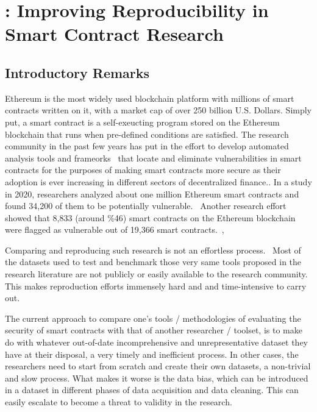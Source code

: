\chapter{\etherbase: Improving Reproducibility in Smart Contract Research} \label{ch:etherbase}


\section{Introductory Remarks}
	\label{sec:intro}
	Ethereum is the most widely used blockchain platform with millions of smart contracts written on it, with a market cap of over 250 billion U.S. Dollars.
	Simply put, a smart contract is a self-exeucting program stored on the Ethereum blockchain that runs when pre-defined conditions are satisfied.
	The research community in the past few years has put in the effort to develop automated analysis tools and frameorks~\cite{ref_tools} that locate and eliminate vulnerabilities in smart contracts for the purposes of making smart contracts more secure as their adoption is ever increasing in different sectors of decentralized finance..
	In a study in 2020, researchers analyzed about one million Ethereum smart contracts and found 34,200 of them to be potentially vulnerable.~\cite{ref_flag1}
	Another research effort showed that 8,833 (around \%46) smart contracts on the Ethereum blockchain were flagged as vulnerable out of 19,366 smart contracts.~\cite{ref_flag2}, ~\cite{Empirical-Evaluation-of-Smart-Contract-Testing:What-is-the-Best-Choice}

	Comparing and reproducing such research is not an effortless process.~\cite{Empirical-Evaluation-of-Smart-Contract-Testing:What-is-the-Best-Choice}
	Most of the datasets used to test and benchmark those very same tools proposed in the research literature are not publicly or easily available to the research community.
	This makes reproduction efforts immensely hard and and time-intensive to carry out.

	The current approach to compare one's tools / methodologies of evaluating the security of smart contracts with that of another researcher / toolset,
	is to make do with whatever out-of-date incomprehensive and unrepresentative dataset they have at their disposal, a very timely and inefficient process.
	In other cases, the researchers need to start from scratch and create their own datasets, a non-trivial and slow process.
	What makes it worse is the data bias, which can be introduced in a dataset in different phases of data acquisition and data cleaning.
	This can easily escalate to become a threat to validity in the research.~\cite{Empirical-Evaluation-of-Smart-Contract-Testing:What-is-the-Best-Choice}

